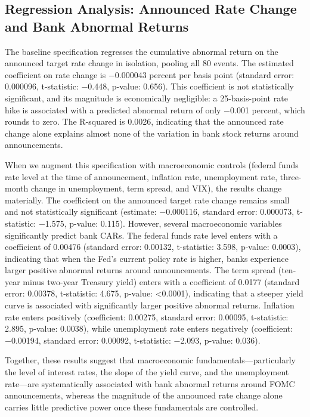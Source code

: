 \documentclass{article}
\begin{document}
\subsection{Regression Analysis: Announced Rate Change and Bank Abnormal Returns}

The baseline specification regresses the cumulative abnormal return on the announced target rate change in isolation, pooling all 80 events. The estimated coefficient on rate change is −0.000043 percent per basis point (standard error: 0.000096, t-statistic: −0.448, p-value: 0.656). This coefficient is not statistically significant, and its magnitude is economically negligible: a 25-basis-point rate hike is associated with a predicted abnormal return of only −0.001 percent, which rounds to zero. The R-squared is 0.0026, indicating that the announced rate change alone explains almost none of the variation in bank stock returns around announcements.

When we augment this specification with macroeconomic controls (federal funds rate level at the time of announcement, inflation rate, unemployment rate, three-month change in unemployment, term spread, and VIX), the results change materially. The coefficient on the announced target rate change remains small and not statistically significant (estimate: −0.000116, standard error: 0.000073, t-statistic: −1.575, p-value: 0.115). However, several macroeconomic variables significantly predict bank CARs. The federal funds rate level enters with a coefficient of 0.00476 (standard error: 0.00132, t-statistic: 3.598, p-value: 0.0003), indicating that when the Fed's current policy rate is higher, banks experience larger positive abnormal returns around announcements. The term spread (ten-year minus two-year Treasury yield) enters with a coefficient of 0.0177 (standard error: 0.00378, t-statistic: 4.675, p-value: <0.0001), indicating that a steeper yield curve is associated with significantly larger positive abnormal returns. Inflation rate enters positively (coefficient: 0.00275, standard error: 0.00095, t-statistic: 2.895, p-value: 0.0038), while unemployment rate enters negatively (coefficient: −0.00194, standard error: 0.00092, t-statistic: −2.093, p-value: 0.036).

Together, these results suggest that macroeconomic fundamentals—particularly the level of interest rates, the slope of the yield curve, and the unemployment rate—are systematically associated with bank abnormal returns around FOMC announcements, whereas the magnitude of the announced rate change alone carries little predictive power once these fundamentals are controlled.
\end{document}

